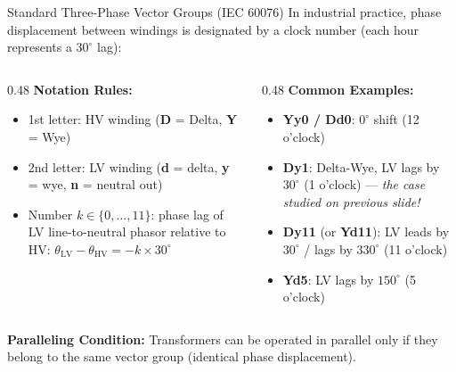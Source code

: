\begin{frame}{Standard Three-Phase Vector Groups (IEC 60076)}
In industrial practice, phase displacement between windings is designated by a \alert{clock number} (each hour represents a $30^\circ$ lag):

\begin{columns}[T]
    \begin{column}{0.48\textwidth}
        \small
        \textbf{Notation Rules:}
        \begin{itemize}
            \item 1st letter: HV winding (\textbf{D} = Delta, \textbf{Y} = Wye)
            \item 2nd letter: LV winding (\textbf{d} = delta, \textbf{y} = wye, \textbf{n} = neutral out)
            \item Number $k \in \{0, \dots, 11\}$: phase lag of LV line-to-neutral phasor relative to HV:
            $\theta_{\text{LV}} - \theta_{\text{HV}} = - k \times 30^\circ$
        \end{itemize}
    \end{column}
    \begin{column}{0.48\textwidth}
        \small
        \textbf{Common Examples:}
        \begin{itemize}
            \item \textbf{Yy0 / Dd0}: $0^\circ$ shift (12 o'clock)
            \item \textbf{Dy1}: Delta-Wye, LV lags by $30^\circ$ (1 o'clock) --- \textit{the case studied on previous slide!}
            \item \textbf{Dy11} (or \textbf{Yd11}): LV leads by $30^\circ$ / lags by $330^\circ$ (11 o'clock)
            \item \textbf{Yd5}: LV lags by $150^\circ$ (5 o'clock)
        \end{itemize}
    \end{column}
\end{columns}

\vspace{0.15cm}
\footnotesize
\textbf{Paralleling Condition:} Transformers can be operated in parallel only if they belong to the \alert{same vector group} (identical phase displacement).
\end{frame}

